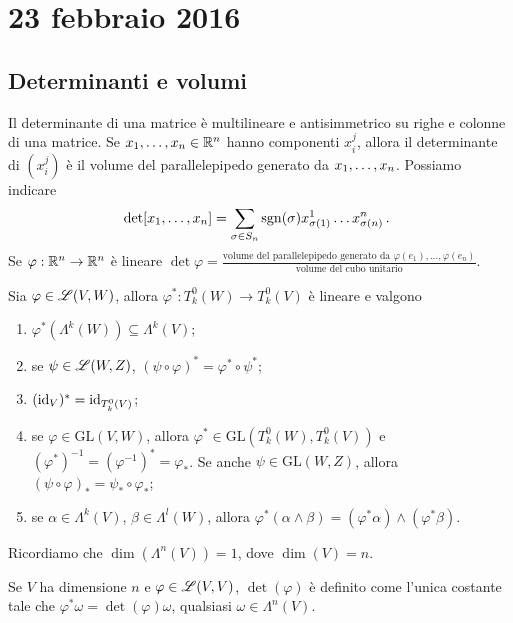 \chapter{23 febbraio 2016}






\section{Determinanti e volumi}

Il determinante di una matrice è multilineare e antisimmetrico su righe e colonne di una matrice.
Se $\seqb xn, \in\R^n$ hanno componenti $x_i^j$, allora il determinante di $(x_i^j)$ è il volume del parallelepipedo generato da $\seqb xn,$.
Possiamo indicare
\begin{equation*}
	\det[\seqb xn,] = \sum_{\sigma\in S_n} \sgn(\sigma) x_{\sigma(1)}^1\ldots x_{\sigma(n)}^n \punto
\end{equation*}
Se $\varphi:\R^n\to\R^n$ è lineare $\det\varphi = \frac{\text{volume del parallelepipedo generato da $\varphi(e_1),\ldots,\varphi(e_n)$}}{\text{volume del cubo unitario}}$.

\begin{proposition}
	Sia $\varphi\in\Lin(V,W)$, allora $\varphi^* : T^0_k(W) \to T^0_k(V)$ è lineare e valgono 
	\begin{enumerate}
		\item $\varphi^*(\Lambda^k(W)) \subseteq \Lambda^k(V)$;
		\item se $\psi\in\Lin(W,Z)$, $(\psi\circ\varphi)^* = \varphi^* \circ \psi^*$;
		\item $(\id_V)^* = \id_{T^0_k(V)}$;
		\item se $\varphi\in \mathrm{GL}(V,W)$, allora $\varphi^*\in \mathrm{GL}(T^0_k(W), T^0_k(V))$ e $(\varphi^*)^{-1} = (\varphi^{-1})^* = \varphi_*$. %
		Se anche $\psi\in\mathrm{GL}(W,Z)$, allora $(\psi\circ\varphi)_* = \psi_*\circ \varphi_*$;
		\item se $\alpha\in\Lambda^k(V)$, $\beta\in\Lambda^l(W)$, allora $\varphi^*(\alpha\wedge\beta) = (\varphi^*\alpha) \wedge (\varphi^*\beta)$.
	\end{enumerate}
\end{proposition}

Ricordiamo che $\dim(\Lambda^n(V)) = 1$, dove $\dim(V)=n$.
\begin{definition}
	Se $V$ ha dimensione $n$ e $\varphi\in\Lin(V,V)$, $\det(\varphi)$ è definito come l'unica costante tale che $\varphi^*\omega = \det(\varphi) \omega$, qualsiasi $\omega\in\Lambda^n(V)$.
\end{definition}

